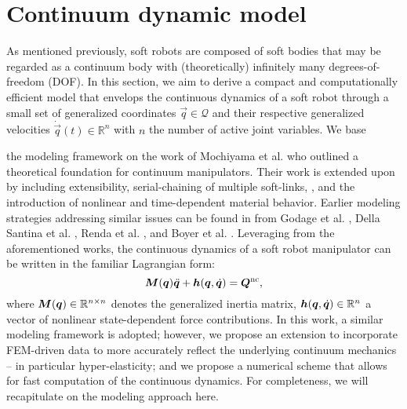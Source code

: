 \section{Continuum dynamic model}
\noindent As mentioned previously, soft robots are composed of soft bodies that may be regarded as a continuum body with (theoretically) infinitely many degrees-of-freedom (DOF). In this section, we aim to derive a compact and computationally efficient model that envelops the continuous dynamics of a soft robot through a small set of generalized coordinates $\vec{q}\in\mathcal{Q}$ and their respective generalized velocities $\dot{\vec{q}}(t)\in\mathbb{R}^n$ with $n$ the number of active joint variables. We base {the modeling framework on the work of Mochiyama et al.\cite{Mochiyama2003} who outlined a theoretical foundation for continuum manipulators. Their work is extended upon by including extensibility, serial-chaining of multiple soft-links, , and the introduction of nonlinear and time-dependent material behavior. Earlier modeling strategies addressing similar issues can be found in from Godage et al. \cite{Godage2015,Godage2016}, Della Santina et al. \cite{Santina2020,Santina2020b,Santina2020Pcc}, Renda et al. \cite{Renda2018}, and Boyer et al. \cite{Boyer2021}. Leveraging from the aforementioned works, the continuous dynamics of a soft robot manipulator can be written in the familiar Lagrangian form:
%
\begin{equation}
\boldsymbol{M}(\boldsymbol{q}) \ddot{\boldsymbol{q}} + \boldsymbol{h}(\boldsymbol{q},\dot{\boldsymbol{q}}) = \boldsymbol{Q}^{\text{nc}},
\end{equation}
%
where $\boldsymbol{M}(\boldsymbol{q}) \in \mathbb{R}^{n\times n}$ denotes the generalized inertia matrix, $\boldsymbol{h}(\boldsymbol{q},\dot{\boldsymbol{q}}) \in \mathbb{R}^{n}$ a vector of nonlinear state-dependent force contributions. In this work, a similar modeling framework is adopted; however, we propose an extension to incorporate FEM-driven data to more accurately reflect the underlying continuum mechanics -- in particular hyper-elasticity; and we propose a numerical scheme that allows for fast computation of the continuous dynamics. For completeness, we will recapitulate on the modeling approach here.
%
\begin{figure}[!t]
\hspace{4mm}
\centering
\end{figure}
%
}

